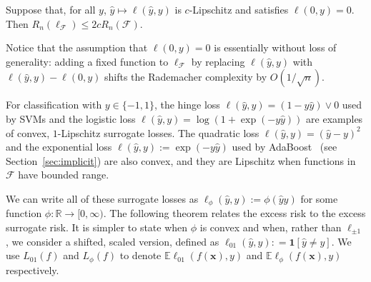 \begin{theorem}\label{thm:contraction}
Suppose that, for all $y$, $\widehat y\mapsto\ell(\widehat y,y)$ is $c$-Lipschitz and satisfies $\ell(0,y)=0$. Then
$R_n(\ell_{{\mathcal F}})\le 2cR_n({\mathcal F})$.
\end{theorem}

Notice that the assumption that $\ell(0,y)=0$ is essentially without loss of generality: adding a fixed function to $\ell_{{\mathcal F}}$ by replacing $\ell(\widehat y,y)$ with $\ell(\widehat y,y)-\ell(0,y)$ shifts the Rademacher complexity by $O\left(1/\sqrt{n}\right)$.

For classification with $y\in\{-1,1\}$, the hinge loss $\ell(\widehat
y,y) = (1-y\widehat y)\vee 0$ used by SVMs and the logistic loss
$\ell(\widehat y,y) = \log\left(1+\exp(-y\widehat y)\right)$ are examples of convex, $1$-Lipschitz surrogate losses.  The quadratic loss
$\ell(\widehat y,y)=(\widehat y-y)^2$ and the exponential loss
$\ell(\widehat
y,y) := \exp(-y\widehat y)$ used by AdaBoost~\cite{fs-dgolab-97} (see Section~\ref{sec:implicit}) are also convex, and they are Lipschitz when functions in ${\mathcal F}$ have bounded range.

We can write all of these surrogate losses as $\ell_\phi(\widehat y,y) := \phi(\widehat y y)$ for some function $\phi:{\mathbb R}\to[0,\infty)$. The following theorem relates the excess risk to the excess surrogate risk. It is simpler to state when $\phi$ is convex and when, rather than $\ell_{\pm 1}$, we consider a shifted, scaled version, defined as $\ell_{01}(\widehat y,y): = \ensuremath{\boldsymbol{1}\left[\widehat y\not=y\right]}$.
We use $L_{01}(f)$ and $L_{\phi}(f)$ to denote ${\mathbb E}\ell_{01}(f({\boldsymbol x}),y)$ and ${\mathbb E}\ell_\phi(f({\boldsymbol x}),y)$ respectively.

